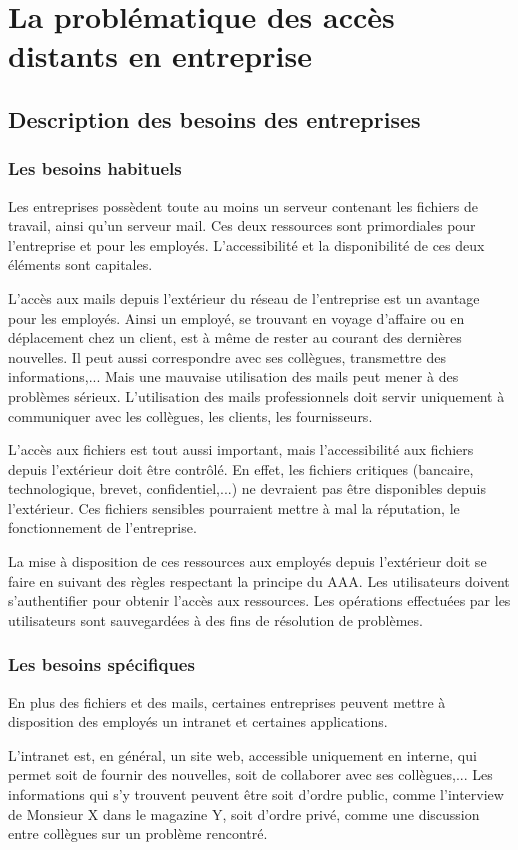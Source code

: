 \part{La problématique des accès distants en entreprise}
\chapter{Description des besoins des entreprises}
\section{Les besoins habituels}
Les entreprises possèdent toute au moins un serveur contenant les fichiers de travail, ainsi qu'un serveur mail.
Ces deux ressources sont primordiales pour l'entreprise et pour les employés.
L'accessibilité et la disponibilité de ces deux éléments sont capitales.

L'accès aux mails depuis l'extérieur du réseau de l'entreprise est un avantage pour les employés.
Ainsi un employé, se trouvant en voyage d'affaire ou en déplacement chez un client, est à même de rester au courant des dernières nouvelles.
Il peut aussi correspondre avec ses collègues, transmettre des informations,...
Mais une mauvaise utilisation des mails peut mener à des problèmes sérieux.
L'utilisation des mails professionnels doit servir uniquement à communiquer avec les collègues, les clients, les fournisseurs.

L'accès aux fichiers est tout aussi important, mais l'accessibilité aux fichiers depuis l'extérieur doit être contrôlé.
En effet, les fichiers critiques (bancaire, technologique, brevet, confidentiel,...) ne devraient pas être disponibles depuis l'extérieur.
Ces fichiers sensibles pourraient mettre à mal la réputation, le fonctionnement de l'entreprise.

La mise à disposition de ces ressources aux employés depuis l'extérieur doit se faire en suivant des règles respectant la principe du AAA.
Les utilisateurs doivent s'authentifier pour obtenir l'accès aux ressources.
Les opérations effectuées par les utilisateurs sont sauvegardées à des fins de résolution de problèmes.
\section{Les besoins spécifiques}
En plus des fichiers et des mails, certaines entreprises peuvent mettre à disposition des employés un intranet et certaines applications.

L'intranet est, en général, un site web, accessible uniquement en interne, qui permet soit de fournir des nouvelles, soit de collaborer avec ses collègues,...
Les informations qui s'y trouvent peuvent être soit d'ordre public, comme l'interview de Monsieur X dans le magazine Y, soit d'ordre privé, comme une discussion entre collègues sur un problème rencontré.

